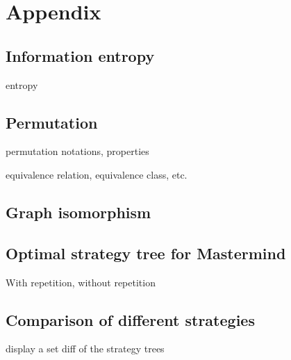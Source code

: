 \section{Appendix}

\subsection{Information entropy}

entropy

\subsection{Permutation}

permutation notations, properties

equivalence relation, equivalence class, etc.

\subsection{Graph isomorphism}

\subsection{Optimal strategy tree for Mastermind}

With repetition, without repetition

\subsection{Comparison of different strategies}

display a set diff of the strategy trees